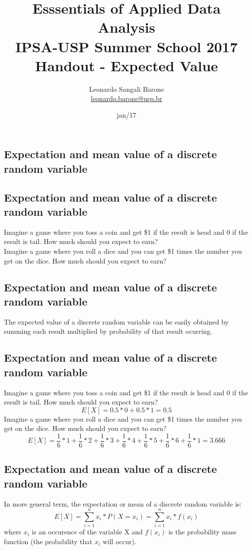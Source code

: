 \documentclass[11pt]{article}
\title{\textbf{Esssentials of Applied Data Analysis\\
				IPSA-USP Summer School 2017}\newline\\
				Handout - Expected Value}
\author{Leonardo Sangali Barone\\ \href{leonardo.barone@usp.br}{leonardo.barone@usp.br}}
\date{jan/17}
\begin{document}
\maketitle

	\subsection*{Expectation and mean value of a discrete random variable}

	\subsection*{Expectation and mean value of a discrete random variable}
	Imagine a game where you toss a coin and get \$1 if the result is head and 0 if the result is tail. How much should you expect to earn?
\newline\\
	Imagine a game where you roll a dice and you can get \$1 times the number you get on the dice. How much should you expect to earn?

	\subsection*{Expectation and mean value of a discrete random variable}
	The expected value of a discrete random variable can be easily obtained by summing each result multiplied by probability of that result ocurring.  
	\subsection*{Expectation and mean value of a discrete random variable}
	Imagine a game where you toss a coin and get \$1 if the result is head and 0 if the result is tail. How much should you expect to earn?
	\[E[X] = 0.5 * 0 + 0.5 * 1 = 0.5\]
	Imagine a game where you roll a dice and you can get \$1 times the number you get on the dice. How much should you expect to earn?	
\small{\[E[X] = \frac{1}{6} * 1 + \frac{1}{6} * 2 + \frac{1}{6} * 3 + \frac{1}{6} * 4 + \frac{1}{6} * 5 + \frac{1}{6} * 6 + \frac{1}{6} * 1 = 3.666\]}


	\subsection*{Expectation and mean value of a discrete random variable}
	In more general term, the expectation or mean of a discrete random variable is:
	\[E[X] = \sum\limits_{i=1}^n x_i * P(X = x_i) = \sum\limits_{i=1}^n x_i * f(x_i)\]
where $x_i$ is an occurence of the variable X and $f(x_i)$ is the probability mass function (the probability that $x_i$ will occur).
\end{document}
